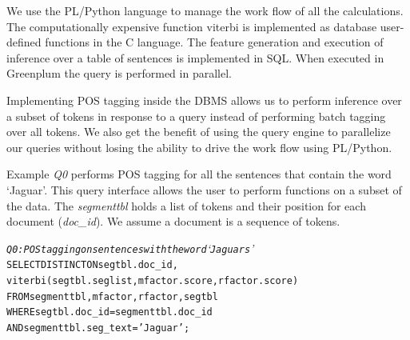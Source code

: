 We use the PL/Python language to manage the work flow of all the 
calculations.
The computationally expensive function viterbi is implemented as database user-defined functions in the C language.
The feature generation and execution of inference 
over a table of sentences is implemented in {SQL}. When executed in Greenplum 
the query is performed in parallel.


Implementing POS tagging inside the DBMS allows us to perform inference over a 
subset of tokens in response to a query instead of performing batch tagging over 
all tokens.
We also get the benefit of using the query engine to parallelize our queries
without losing the ability to drive the work flow using PL/Python.


Example \textit{Q0} performs POS tagging for  all the sentences that contain
the word `Jaguar'. This query interface allows the user to perform
functions on a subset of the data.
The \textit{segmenttbl} holds a list of tokens and their position for each
document (\textit{doc\_id}). We assume a document is a sequence of tokens.


\begin{small}
\begin{alltt}
\textit{Q0: POS tagging on sentences with the word `Jaguars'}
SELECT DISTINCT ON segtbl.doc_id,
    viterbi(segtbl.seglist,mfactor.score,rfactor.score)
FROM segmenttbl, mfactor, rfactor, segtbl
WHERE segtbl.doc_id = segmenttbl.doc_id 
    AND segmenttbl.seg_text='Jaguar';
\end{alltt}
\end{small}













